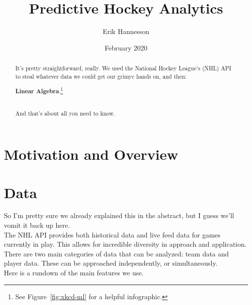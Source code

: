 \documentclass{notes}
\author{Erik Hannesson}
\title{Predictive Hockey Analytics}
\date{February 2020}
\begin{document}
  \maketitle
  \begin{abstract}
    It's pretty straightforward, really.
    We used the National Hockey League's (NHL) API to steal whatever data we could get our grimyc hands on, and then:\\

    \begin{center}
      {\Large \textbf{Linear Algebra}.}\footnote{See Figure~\ref{fig:xkcd-ml} for a helpful infographic.}
    \end{center}
    \hfill\\
    And that's about all you need to know.
  \end{abstract}

  \section{Motivation and Overview}


  \section{Data}
    So I'm pretty sure we already explained this in the abstract, but I guess we'll vomit it back up here.\\

    The NHL API provides both historical data and live feed data for games currently in play.
    This allows for incredible diversity in approach and application.\\

    There are two main categories of data that can be analyzed: team data and player data.
    These can be approached independently, or simultaneously.\\

    Here is a rundown of the main features we use.\\
\end{document}
